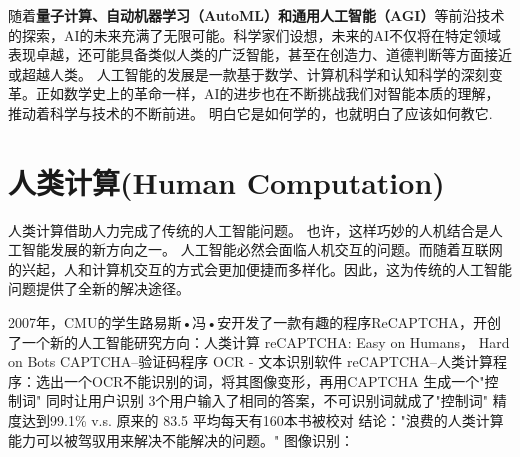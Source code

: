 %
%
%
%
%
随着{\bf 量子计算、自动机器学习（AutoML）和通用人工智能（AGI）}等前沿技术的探索，AI的未来充满了无限可能。科学家们设想，未来的AI不仅将在特定领域表现卓越，还可能具备类似人类的广泛智能，甚至在创造力、道德判断等方面接近或超越人类。
人工智能的发展是一款基于数学、计算机科学和认知科学的深刻变革。正如数学史上的革命一样，AI的进步也在不断挑战我们对智能本质的理解，推动着科学与技术的不断前进。
明白它是如何学的，也就明白了应该如何教它.
\section{人类计算(Human Computation)}


人类计算借助人力完成了传统的人工智能问题。
 也许，这样巧妙的人机结合是人工智能发展的新方向之一。
人工智能必然会面临人机交互的问题。而随着互联网的兴起，人和计算机交互的方式会更加便捷而多样化。因此，这为传统的人工智能问题提供了全新的解决途径。

 2007年，CMU的学生路易斯•冯•安开发了一款有趣的程序ReCAPTCHA，开创了一个新的人工智能研究方向：人类计算
reCAPTCHA: Easy on Humans， Hard on Bots
 CAPTCHA–验证码程序
 OCR - 文本识别软件
 reCAPTCHA–人类计算程序：选出一个OCR不能识别的词，将其图像变形，再用CAPTCHA 生成一个"控制词" 同时让用户识别
 3个用户输入了相同的答案，不可识别词就成了"控制词"
 精度达到99.1\% v.s. 原来的 83.5%
 平均每天有160本书被校对
结论："浪费的人类计算能力可以被驾驭用来解决不能解决的问题。"
图像识别：

